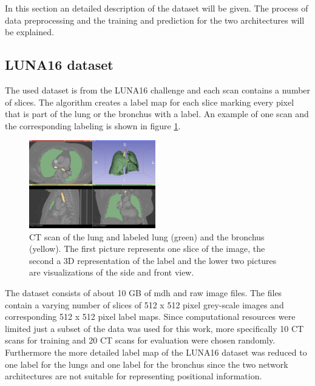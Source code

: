 
In this section an detailed description of the dataset will be given. The process of data preprocessing and the training and prediction for the two architectures will be explained.

\subsection{LUNA16 dataset}

The used dataset is from the LUNA16 challenge and each scan contains a number of slices. The algorithm creates a label map for each slice marking every pixel that is part of the lung or the bronchus with a label. An example of one scan and the corresponding labeling is shown in figure \ref{scan_picture}.

\begin{figure}[h!]
	\includegraphics[width=0.49\textwidth, angle=0]{files/Fulllayoutprediction.png}
	\caption{CT scan of the lung and labeled lung (green) and the bronchus (yellow). The first picture represents one slice of the image, the second a 3D representation of the label and the lower two pictures are visualizations of the side and front view.}
	\label{scan_picture}
\end{figure}

The dataset consists of about 10 GB of mdh and raw image files. The files contain a varying number of slices of 512 x 512 pixel grey-scale images and corresponding 512 x 512 pixel label maps. Since computational resources were limited just a subset of the data was used for this work, more specifically 10 CT scans for training and 20 CT scans for evaluation were chosen randomly. Furthermore the more detailed label map of the LUNA16 dataset was reduced to one label for the lungs and one label for the bronchus since the two network architectures are not suitable for representing positional information.\newline

